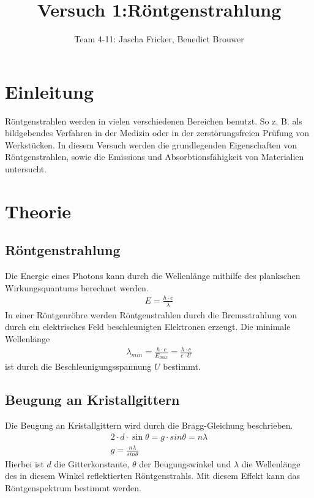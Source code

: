 \documentclass[11pt, a4paper]{article}
\title{Versuch 1:Röntgenstrahlung}
\author{Team 4-11: Jascha Fricker, Benedict Brouwer}
\begin{document}
    \maketitle

    \tableofcontents

    \newpage

    \section{Einleitung}

    Röntgenstrahlen werden in vielen verschiedenen Bereichen benutzt. So z. B. als bildgebendes Verfahren in der Medizin oder in der zerstörungsfreien Prüfung von Werkstücken. In diesem Versuch werden die grundlegenden Eigenschaften von Röntgenstrahlen, sowie die Emissions und Absorbtionsfähigkeit von Materialien untersucht.

    \section{Theorie}

    \subsection{Röntgenstrahlung}

    Die Energie eines Photons kann durch die Wellenlänge mithilfe des plankschen Wirkungsquantums berechnet werden.
    \begin{align}
        E = \frac{h \cdot c}{\lambda}
    \end{align}
    In einer Röntgenröhre werden Röntgenstrahlen durch die Bremsstrahlung von durch ein elektrisches Feld beschleunigten Elektronen erzeugt. Die minimale Wellenlänge
    \begin{align}
        \lambda_{min} = \frac{h \cdot c}{E_{max}} = \frac{h \cdot c}{e \cdot U}
    \end{align}
    ist durch die Beschleunigungsspannung $U$ bestimmt.

    \subsection{Beugung an Kristallgittern}

    Die Beugung an Kristallgittern wird durch die Bragg-Gleichung beschrieben.
    \begin{align}
        2 \cdot d \cdot \sin \theta = g \cdot sin \theta = n \lambda \\
        g = \frac{n \lambda}{sin \theta} \label{eq:gitter}
    \end{align}
    Hierbei ist $d$ die Gitterkonstante, $\theta$ der Beugungswinkel und $\lambda$ die Wellenlänge des in diesem Winkel reflektierten Röntgenstrahls. Mit diesem Effekt kann das Röntgenspektrum bestimmt werden.
\end{document}
